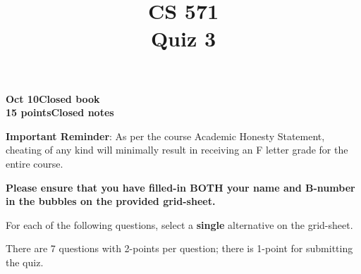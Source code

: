 \documentclass[12pt]{article}
\title{CS 571\\Quiz 3}
\date{}
\begin{document}
\maketitle

\begin{flushleft}
\textbf{Oct 10}\hfill\textbf{Closed book}\\
\textbf{15 points}\hfill\textbf{Closed notes}\\

\vspace{0.5cm}

\textbf{Important Reminder}: As per the course Academic Honesty
Statement, cheating of any kind will minimally result in receiving an
F letter grade for the entire course.


\end{flushleft}

\textbf{Please ensure that you have filled-in BOTH your name and
  B-number in the bubbles on the provided grid-sheet.}

For each of the following questions, select a \textbf{single}
alternative on the grid-sheet.  

There are 7 questions with 2-points per question; there is 1-point
for submitting the quiz.
\end{document}
